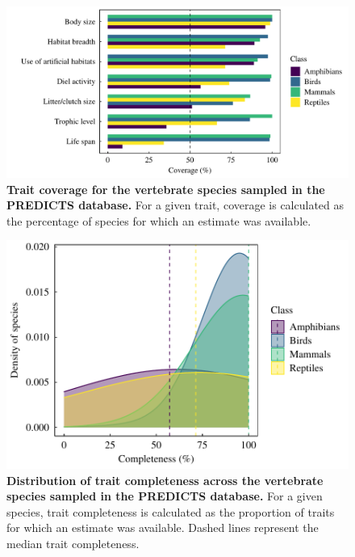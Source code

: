 \begin{figure}[h!]
\centering
\includegraphics[scale=0.8]{Supporting/Chapter3/Figures/SI_coverage}
\caption[Trait coverage for the vertebrate species sampled in the PREDICTS database]{\textbf{Trait coverage for the vertebrate species sampled in the PREDICTS database.} For a given trait, coverage is calculated as the percentage of species for which an estimate was available.}
\label{}
\end{figure}

\begin{figure}[h!]
\centering
\includegraphics[scale=0.8]{Supporting/Chapter3/Figures/SI_completeness}
\caption[Distribution of trait completeness across the vertebrate species sampled in the PREDICTS database]{\textbf{Distribution of trait completeness across the vertebrate species sampled in the PREDICTS database.} For a given species, trait completeness is calculated as the proportion of traits for which an estimate was available. Dashed lines represent the median trait completeness.}
\label{}
\end{figure}


